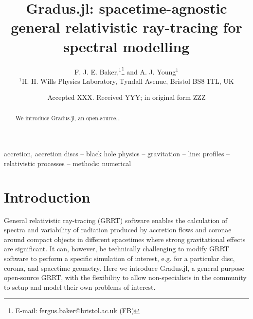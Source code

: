 \documentclass[fleqn,usenatbib]{mnras}
\title[Gradus.jl]{Gradus.jl: spacetime-agnostic general relativistic ray-tracing
for spectral modelling}
\author[F. J. E. Baker et al.]{
F. J. E. Baker,$^{1}$\thanks{E-mail: fergus.baker@bristol.ac.uk (FB)}
and A. J. Young$^{1}$
\\
$^{1}$H. H. Wills Physics Laboratory, Tyndall Avenue, Bristol BS8 1TL, UK
}
\date{Accepted XXX. Received YYY; in original form ZZZ}
\newcommand{\Gradus}{Gradus.jl\xspace}
\begin{document}
\label{firstpage}
\pagerange{\pageref{firstpage}--\pageref{lastpage}}
\maketitle
\begin{abstract}
	We introduce \Gradus, an open-source...
\end{abstract}

\begin{keywords}
accretion, accretion discs -- black hole physics -- gravitation -- line: profiles -- relativistic processes -- methods: numerical
\end{keywords}



\section{Introduction}

General relativistic ray-tracing (GRRT) software enables the calculation of
spectra and variability of radiation produced by accretion flows and coronae
around compact objects in different spacetimes where strong gravitational
effects are significant. It can, however, be technically challenging to modify
GRRT software to perform a specific simulation of interest, e.g. for a
particular disc, corona, and spacetime geometry. Here we introduce Gradus.jl, a
general purpose open-source GRRT, with the flexibility to allow non-specialists
in the community to setup and model their own problems of interest.
\end{document}
